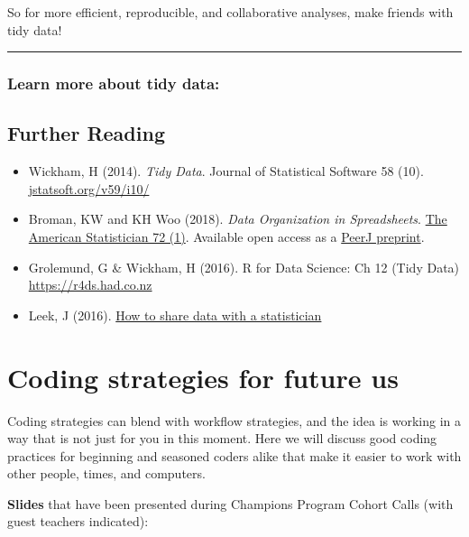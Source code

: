 \documentclass[
  letterpaper,
  DIV=11,
  numbers=noendperiod]{scrreprt}
\begin{document}
So for more efficient, reproducible, and collaborative analyses, make
friends with tidy data!

\begin{center}\rule{0.5\linewidth}{0.5pt}\end{center}

\hypertarget{learn-more-about-tidy-data}{%
\subsection{Learn more about tidy
data:}\label{learn-more-about-tidy-data}}

\hypertarget{further-reading-1}{%
\section{Further Reading}\label{further-reading-1}}

\begin{itemize}
\item
  Wickham, H (2014). \emph{Tidy Data}. Journal of Statistical Software
  58 (10).
  \href{http://www.jstatsoft.org/v59/i10/}{jstatsoft.org/v59/i10/}
\item
  Broman, KW and KH Woo (2018). \emph{Data Organization in
  Spreadsheets}.
  \href{https://doi.org/10.1080/00031305.2017.1375989}{The American
  Statistician 72 (1)}. Available open access as a
  \href{https://peerj.com/preprints/3183/}{PeerJ preprint}.
\item
  Grolemund, G \& Wickham, H (2016). R for Data Science: Ch 12 (Tidy
  Data) \url{https://r4ds.had.co.nz}
\item
  Leek, J (2016). \href{https://github.com/jtleek/datasharing}{How to
  share data with a statistician}
\end{itemize}

\hypertarget{coding-strategies}{%
\chapter{Coding strategies for future us}\label{coding-strategies}}

Coding strategies can blend with workflow strategies, and the idea is
working in a way that is not just for you in this moment. Here we will
discuss good coding practices for beginning and seasoned coders alike
that make it easier to work with other people, times, and computers.

\textbf{Slides} that have been presented during Champions Program Cohort
Calls (with guest teachers indicated):
\end{document}
